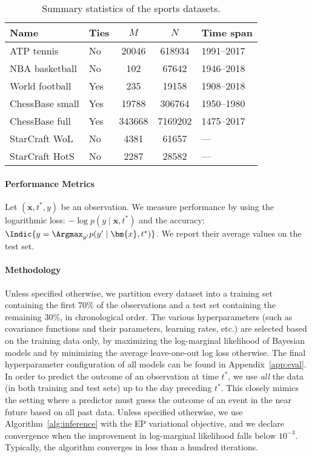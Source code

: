\begin{table}[t]
	\caption{
		Summary statistics of the sports datasets.}
	\label{kks:tab:datasets}
	\centering
	\begin{tabular}{l lS[table-format=6.0]S[table-format=7.0]l}
		\toprule
		Name            & Ties & $M$    & $N$     & Time span  \\
		\midrule
		ATP tennis      & No   & 20046  & 618934  & 1991--2017 \\
		NBA basketball  & No   & 102    & 67642   & 1946--2018 \\
		World football  & Yes  & 235    & 19158   & 1908--2018 \\
		ChessBase small & Yes  & 19788  & 306764  & 1950--1980 \\
		ChessBase full  & Yes  & 343668 & 7169202 & 1475--2017 \\
		\addlinespace
		StarCraft WoL   & No   & 4381   & 61657   & ---        \\
		StarCraft HotS  & No   & 2287   & 28582   & ---        \\
		\bottomrule
	\end{tabular}
\end{table}

\paragraph{Performance Metrics}
Let $(\bm{x}, t^*, y)$ be an observation.
We measure performance by using
the logarithmic loss: $-\log p(y \mid \bm{x}, t^*)$ and
the accuracy: $\Indic{y = \Argmax_{y'} p(y' \mid \bm{x}, t^*)}$.
We report their average values on the test set.

\paragraph{Methodology}
Unless specified otherwise, we partition every dataset into a training set containing the first 70\% of the observations and a test set containing the remaining 30\%, in chronological order.
The various hyperparameters (such as covariance functions and their parameters, learning rates, etc.) are selected based on the training data only, by maximizing the log-marginal likelihood of Bayesian models and by minimizing the average leave-one-out log loss otherwise.
The final hyperparameter configuration of all models can be found in Appendix~\ref{app:eval}.
In order to predict the outcome of an observation at time $t^*$, we use \emph{all} the data (in both training and test sets) up to the day preceding $t^*$.
This closely mimics the setting where a predictor must guess the outcome of an event in the near future based on all past data.
Unless specified otherwise, we use Algorithm~\ref{alg:inference} with the EP variational objective, and we declare convergence when the improvement in log-marginal likelihood falls below $10^{-3}$.
Typically, the algorithm converges in less than a hundred iterations.


